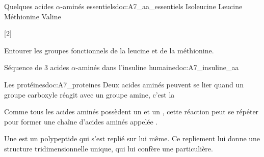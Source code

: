 \begin{doc}{Quelques acides $\alpha$-aminés essentiels}{doc:A7_aa_essentiels}
  \centering
  \chemname {\chemfig{!\isoleucine}} {Isoleucine}
  \chemname {\chemfig{!\leucine}}    {Leucine}
  \chemname {\chemfig{!\methionine}} {Méthionine}
  \chemname {\chemfig{!\valine}}     {Valine}
\end{doc}

[2]

\numeroQuestion Entourer les groupes fonctionnels de la leucine et de la méthionine.


\begin{doc}{Séquence de 3 acides $\alpha$-aminés dans l'insuline humaine}{doc:A7_insuline_aa}
  \begin{center}
    
  \end{center}
\end{doc}

\begin{doc}{Les protéines}{doc:A7_proteines}
  Deux acides aminés peuvent se lier quand un groupe carboxyle réagit avec un groupe amine, c'est la 

  \vspace*{-14pt}
  \begin{center}
  \end{center}
  \vspace*{-18pt}

  Comme tous les acides aminés possèdent un  et un , cette réaction peut se répéter pour former une chaîne d'acides aminés appelée .

  \begin{importants}
    Une  est un polypeptide qui s'est replié sur lui même.
    Ce repliement lui donne une structure tridimensionnelle unique, qui lui confère une  particulière.
  \end{importants}
  \begin{center}
  \end{center}
\end{doc}


